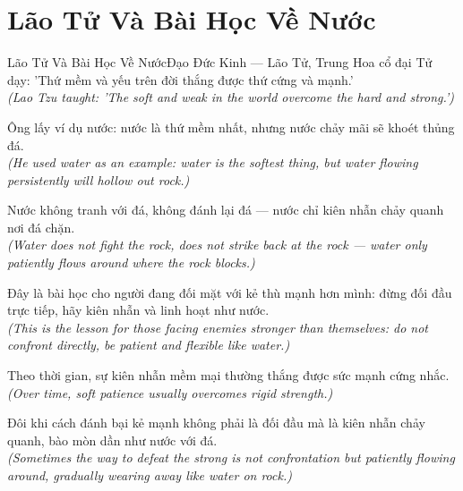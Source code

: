 \section{Lão Tử Và Bài Học Về Nước}
\begin{truyen}{Lão Tử Và Bài Học Về Nước}{Đạo Đức Kinh --- Lão Tử, Trung Hoa cổ đại}
 Tử dạy: 'Thứ mềm và yếu trên đời thắng được thứ cứng và mạnh.'\\[4pt]
\textit{(Lao Tzu taught: 'The soft and weak in the world overcome the hard and strong.')}

Ông lấy ví dụ nước: nước là thứ mềm nhất, nhưng nước chảy mãi sẽ khoét thủng đá.\\[4pt]
\textit{(He used water as an example: water is the softest thing, but water flowing persistently will hollow out rock.)}

Nước không tranh với đá, không đánh lại đá --- nước chỉ kiên nhẫn chảy quanh nơi đá chặn.\\[4pt]
\textit{(Water does not fight the rock, does not strike back at the rock --- water only patiently flows around where the rock blocks.)}

Đây là bài học cho người đang đối mặt với kẻ thù mạnh hơn mình: đừng đối đầu trực tiếp, hãy kiên nhẫn và linh hoạt như nước.\\[4pt]
\textit{(This is the lesson for those facing enemies stronger than themselves: do not confront directly, be patient and flexible like water.)}

Theo thời gian, sự kiên nhẫn mềm mại thường thắng được sức mạnh cứng nhắc.\\[4pt]
\textit{(Over time, soft patience usually overcomes rigid strength.)}

\end{truyen}
\begin{baihoc}
  Đôi khi cách đánh bại kẻ mạnh không phải là đối đầu mà là kiên nhẫn chảy quanh, bào mòn dần như nước với đá.\\[4pt]
  \textit{(Sometimes the way to defeat the strong is not confrontation but patiently flowing around, gradually wearing away like water on rock.)}
\end{baihoc}

